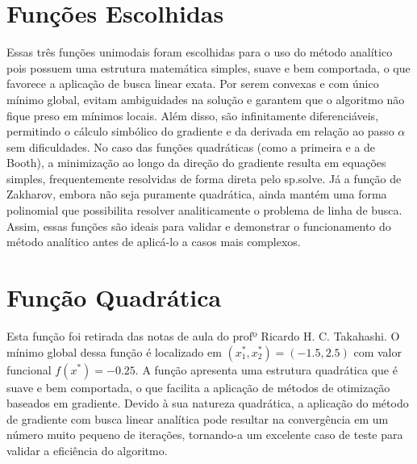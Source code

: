 \documentclass[runningheads]{llncs}
\begin{document}
\section{ Funções Escolhidas}

\begin{table}[h]
\caption{Características das funções}\label{tab:funcoes}%
\end{table}

Essas três funções unimodais foram escolhidas para o uso do método analítico pois possuem uma estrutura matemática simples, suave e bem comportada, o que favorece a aplicação de busca linear exata. Por serem convexas e com único mínimo global, evitam ambiguidades na solução e garantem que o algoritmo não fique preso em mínimos locais. Além disso, são infinitamente diferenciáveis, permitindo o cálculo simbólico do gradiente e da derivada em relação ao passo $\alpha$ sem dificuldades. No caso das funções quadráticas (como a primeira e a de Booth), a minimização ao longo da direção do gradiente resulta em equações simples, frequentemente resolvidas de forma direta pelo sp.solve. Já a função de Zakharov, embora não seja puramente quadrática, ainda mantém uma forma polinomial que possibilita resolver analiticamente o problema de linha de busca. Assim, essas funções são ideais para validar e demonstrar o funcionamento do método analítico antes de aplicá-lo a casos mais complexos.

\section{ Função Quadrática}
Esta função foi retirada das notas de aula do profº Ricardo H. C. Takahashi. O mínimo global dessa função é localizado em $(x_1^*, x_2^*) = (-1.5, 2.5)$ com valor funcional $f(x^*) = -0.25$. A função apresenta uma estrutura quadrática que é suave e bem comportada, o que facilita a aplicação de métodos de otimização baseados em gradiente. Devido à sua natureza quadrática, a aplicação do método de gradiente com busca linear analítica pode resultar na convergência em um número muito pequeno de iterações, tornando-a um excelente caso de teste para validar a eficiência do algoritmo.
\end{document}
